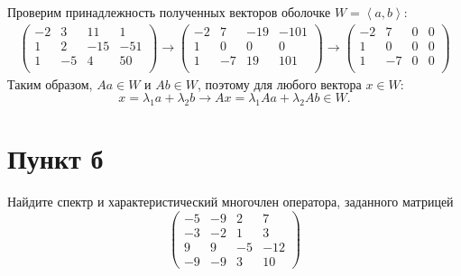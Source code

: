 \documentclass[12pt]{article}
\begin{document}
    Проверим принадлежность полученных векторов оболочке $W = \left < a, b \right >$:
    \begin{gather*}
        \begin{pmatrix}
            -2 & 3 & 11 & 1 \\
            1 & 2 & -15 & -51 \\
            1 & -5 & 4 & 50 \\
        \end{pmatrix}
        \rightarrow
        \begin{pmatrix}
            -2 & 7 & -19 & -101 \\
            1 & 0 & 0 & 0 \\
            1 & -7 & 19 & 101 \\
        \end{pmatrix}
        \rightarrow
        \begin{pmatrix}
            -2 & 7 & 0 & 0 \\
            1 & 0 & 0 & 0 \\
            1 & -7 & 0 & 0 \\
        \end{pmatrix}
    \end{gather*}
    Таким образом, $Aa \in W$ и $Ab \in W$, поэтому для любого вектора $x \in W$:
    \[
        x = \lambda_1 a + \lambda_2 b
        \rightarrow
        A x = \lambda_1 Aa + \lambda_2 Ab \in W.
    \]

    \section*{Пункт б}
    Найдите спектр и характеристический многочлен оператора, заданного матрицей
    \[
        \begin{pmatrix}
            -5 & -9 & 2 & 7 \\
            -3 & -2 & 1 & 3 \\
            9 & 9 & -5 & -12 \\
            -9 & -9 & 3 & 10
        \end{pmatrix}
    \]
\end{document}
